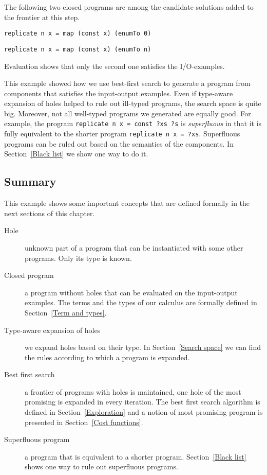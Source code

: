 The following two closed programs are among the candidate solutions added to the frontier at this step.
\begin{lstlisting}
replicate n x = map (const x) (enumTo 0)
\end{lstlisting}
\begin{lstlisting}
replicate n x = map (const x) (enumTo n)
\end{lstlisting}
Evaluation shows that only the second one satisfies the I/O-examples.

This example showed how we use best-first search to generate a program from components that satisfies the input-output examples. Even if type-aware expansion of holes helped to rule out ill-typed programs, the search space is quite big. Moreover, not all well-typed programs we generated are equally good. For example, the program \lstinline!replicate n x = const ?xs ?s! is \emph{superfluous} in that it is fully equivalent to the shorter program \lstinline!replicate n x = ?xs!. Superfluous programs can be ruled out based on the semantics of the components. In Section~\ref{Black list} we show one way to do it.

\subsection{Summary}

This example shows some important concepts that are defined formally in the next sections of this chapter.
\begin{description}
\item[Hole] unknown part of a program that can be instantiated with some other programs. Only its type is known.
\item[Closed program] a program without holes that can be evaluated on the input-output examples. The terms and the types of our calculus are formally defined in Section~\ref{Term and types}.
\item[Type-aware expansion of holes] we expand holes based on their type. In Section~\ref{Search space} we can find the rules according to which a program is expanded.
\item[Best first search] a frontier of programs with holes is maintained, one hole of the most promising is expanded in every iteration. The best first search algorithm is defined in Section~\ref{Exploration} and a notion of most promising program is presented in Section~\ref{Cost functions}.
\item[Superfluous program] a program that is equivalent to a shorter program. Section~\ref{Black list} shows one way to rule out superfluous programs.
\end{description}